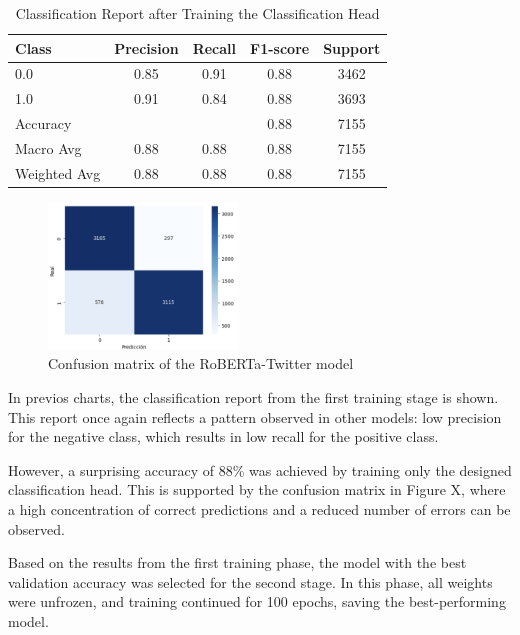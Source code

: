 \begin{table}[H]
\centering
\caption{Classification Report after Training the Classification Head}
\label{tab:classification_report_2}
\begin{tabular}{lcccc}
\toprule
Class        & Precision & Recall & F1-score & Support \\
\midrule
0.0          & 0.85      & 0.91   & 0.88     & 3462    \\
1.0          & 0.91      & 0.84   & 0.88     & 3693    \\
\midrule
Accuracy     &           &        & 0.88     & 7155    \\
Macro Avg    & 0.88      & 0.88   & 0.88     & 7155    \\
Weighted Avg & 0.88      & 0.88   & 0.88     & 7155    \\
\bottomrule
\end{tabular}
\end{table}

\begin{figure}[H]
    \centering
    \includegraphics[width=0.45\textwidth]{images/robertaConfusionMatrix.png} 
    \caption{Confusion matrix of the RoBERTa-Twitter model}
    \label{fig:roberta_confusion_matrix}
\end{figure}

In previos charts, the classification report from the first training stage is shown. This report once again reflects a pattern observed in other models: low precision for the negative class, which results in low recall for the positive class. 

However, a surprising accuracy of 88\% was achieved by training only the designed classification head. This is supported by the confusion matrix in Figure X, where a high concentration of correct predictions and a reduced number of errors can be observed.

Based on the results from the first training phase, the model with the best validation accuracy was selected for the second stage. In this phase, all weights were unfrozen, and training continued for 100 epochs, saving the best-performing model.


